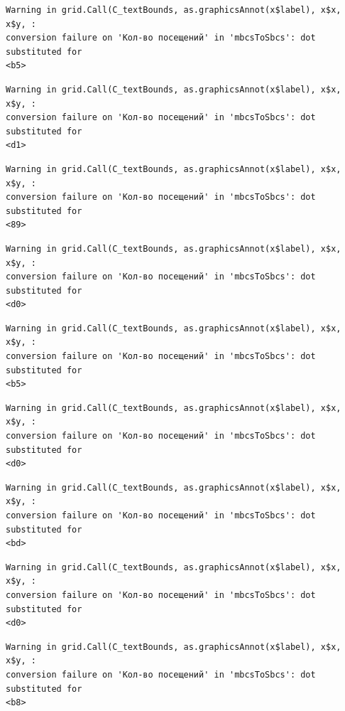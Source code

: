 \documentclass[
  letterpaper,
  DIV=11,
  numbers=noendperiod]{scrartcl}
\begin{document}
\begin{verbatim}
Warning in grid.Call(C_textBounds, as.graphicsAnnot(x$label), x$x, x$y, :
conversion failure on 'Кол-во посещений' in 'mbcsToSbcs': dot substituted for
<b5>
\end{verbatim}

\begin{verbatim}
Warning in grid.Call(C_textBounds, as.graphicsAnnot(x$label), x$x, x$y, :
conversion failure on 'Кол-во посещений' in 'mbcsToSbcs': dot substituted for
<d1>
\end{verbatim}

\begin{verbatim}
Warning in grid.Call(C_textBounds, as.graphicsAnnot(x$label), x$x, x$y, :
conversion failure on 'Кол-во посещений' in 'mbcsToSbcs': dot substituted for
<89>
\end{verbatim}

\begin{verbatim}
Warning in grid.Call(C_textBounds, as.graphicsAnnot(x$label), x$x, x$y, :
conversion failure on 'Кол-во посещений' in 'mbcsToSbcs': dot substituted for
<d0>
\end{verbatim}

\begin{verbatim}
Warning in grid.Call(C_textBounds, as.graphicsAnnot(x$label), x$x, x$y, :
conversion failure on 'Кол-во посещений' in 'mbcsToSbcs': dot substituted for
<b5>
\end{verbatim}

\begin{verbatim}
Warning in grid.Call(C_textBounds, as.graphicsAnnot(x$label), x$x, x$y, :
conversion failure on 'Кол-во посещений' in 'mbcsToSbcs': dot substituted for
<d0>
\end{verbatim}

\begin{verbatim}
Warning in grid.Call(C_textBounds, as.graphicsAnnot(x$label), x$x, x$y, :
conversion failure on 'Кол-во посещений' in 'mbcsToSbcs': dot substituted for
<bd>
\end{verbatim}

\begin{verbatim}
Warning in grid.Call(C_textBounds, as.graphicsAnnot(x$label), x$x, x$y, :
conversion failure on 'Кол-во посещений' in 'mbcsToSbcs': dot substituted for
<d0>
\end{verbatim}

\begin{verbatim}
Warning in grid.Call(C_textBounds, as.graphicsAnnot(x$label), x$x, x$y, :
conversion failure on 'Кол-во посещений' in 'mbcsToSbcs': dot substituted for
<b8>
\end{verbatim}
\end{document}
